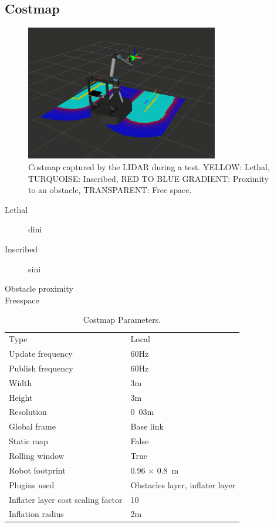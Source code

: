 \subsection{Costmap}
\begin{figure}
   \centering
   \includegraphics[width=0.75\textwidth]{images/costmap.png}
   \caption{Costmap captured by the LIDAR during a test. YELLOW: Lethal, TURQUOISE: Inscribed, RED TO BLUE GRADIENT: Proximity to an obstacle, TRANSPARENT: Free space. }
   \label{pics:costmap}
\end{figure}

\begin{description}
  \item[Lethal] dini 
  \item[Inscribed] sini
  \item[Obstacle proximity]
  \item[Freespace]
\end{description}

\begin{table}[h]
\begin{center}
 \caption{Costmap Parameters.}\vspace{1ex}
 \label{tab:costmap_params}
 \begin{tabular}{ll}
 \hline
Type & Local \\
Update frequency & \unit{60}{Hz} \\
Publish frequency & \unit{60}{Hz} \\ 
Width & \unit{3}{m} \\
Height & \unit{3}{m} \\
Resolution & \unit{0.03}{m} \\
Global frame & Base link \\
Static map & False \\
Rolling window & True \\
Robot footprint & \unit{0.96 $\times$ 0.8}{m} \\
Plugins used & Obstacles layer, inflater layer \\
Inflater layer cost scaling factor & 10  \\
Inflation radius & \unit{2}{m} \\
 \hline
 \end{tabular}
\end{center}
\end{table}

